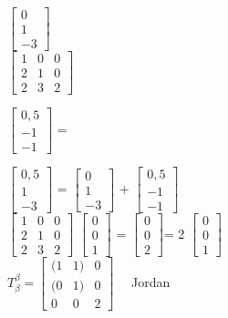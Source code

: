 \documentclass[a4paper,12pt]{report}
\begin{document}
 $\left [\begin{array}{rrr}
0\\
1\\
-3
\end{array}\right]$ \\

$\left [\begin{array}{rrr}
1&0&0\\
2&1&0\\
2&3&2
\end{array}\right]$ 

$\left [\begin{array}{rrr}
0,5\\
-1\\
-1
\end{array}\right]$ =

 $\left [\begin{array}{rrr}
0,5\\
1\\
-3
\end{array}\right] $ = 
$\left [\begin{array}{rrr}
0\\
1\\
-3
\end{array}\right]$ + 
$\left [\begin{array}{rrr}
0,5\\
-1\\
-1
\end{array}\right]$\\

$\left [\begin{array}{rrr}
1&0&0\\
2&1&0\\
2&3&2
\end{array}\right]$
$ \left [\begin{array}{rrr}
0\\
0\\
1
\end{array}\right] $ = 
$\left [\begin{array}{rrr}
0\\
0\\
2
\end{array}\right] $= 2 
$\left [\begin{array}{rrr}
0\\
0\\
1
\end{array}\right]$ \\

$T_\beta^\beta = \left [\begin{array}{rrr}
(1&1)&0\\
(0&1)&0\\
0&0&2
\end{array}\right]$ \ \ Jordan \\
\end{document}
